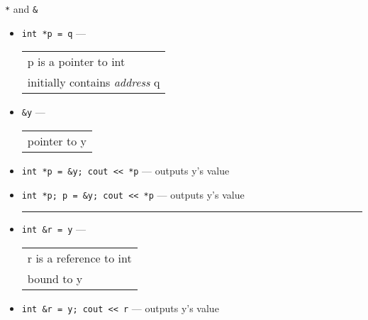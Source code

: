 \begin{frame}[fragile,label=confAmp]{\texttt{*} and \texttt{\&}}
\lstset{
    language=C++,
    style=small,
}
\begin{itemize}
    \item \lstinline|int *p = q| --- \begin{tabular}{l}p is a pointer to int\\ initially contains \textit{address} q\end{tabular}
\item \lstinline|&y| --- \begin{tabular}{l}
                                 pointer to y
                            \end{tabular}
\item \lstinline|int *p = &y; cout << *p| --- outputs y's value
\item \lstinline|int *p; p = &y; cout << *p| --- outputs y's value
    \hrule
\item \lstinline|int &r = y| --- \begin{tabular}{l}
                                    r is a reference to int \\
                                    bound to y
                                 \end{tabular}
\item \lstinline|int &r = y; cout << r| --- outputs y's value
\end{itemize}
\end{frame}
